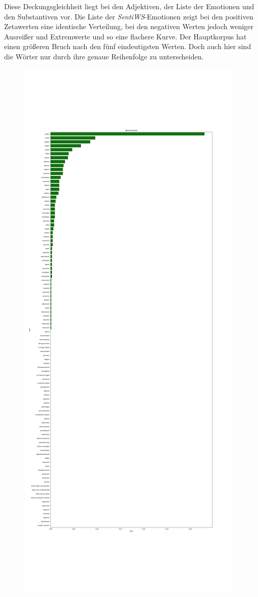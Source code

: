 \documentclass[a4paper,10p]{article}
\begin{document}
Diese Deckungsgleichheit liegt bei den Adjektiven, der Liste der Emotionen und den Substantiven vor. Die Liste der \emph{SentiWS}-Emotionen zeigt bei den positiven Zetawerten eine identische Verteilung,  bei den negativen Werten jedoch weniger Ausreißer und Extremwerte und so eine flachere Kurve. Der Hauptkorpus hat einen größeren Bruch nach den fünf eindeutigsten Werten. Doch auch hier sind die Wörter nur durch ihre genaue Reihenfolge zu unterscheiden.  \par 

\begin{figure}{}
    \centering
    \begin{minipage}[b]{.45\linewidth}
        \centering
        \includegraphics[width=\linewidth]{autoren_sprechmarker_lang_pro_wort.png}

\end{minipage}
\end{figure}
\end{document}
